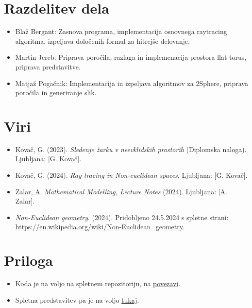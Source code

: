 \documentclass[titlepage]{article}
\begin{document}
\section{Razdelitev dela}
\begin{itemize}
  \item Blaž Bergant: Zasnova programa, implementacija osnovnega raytracing algoritma, izpeljava določenih formul za hitrejše delovanje.
  \item Martin Jereb: Priprava poročila, razlaga in implemenacija prostora flat torus, priprava predstavitve.
\item Matjaž Pogačnik: Implementacija in izpeljava algoritmov za 2Sphere, priprava poročila in generiranje slik.
\end{itemize}

\section{Viri}
\begin{itemize}
  \item Kovač, G. (2023). \textit{Sledenje žarku v neevklidskih prostorih} (Diplomska naloga). Ljubljana: [G. Kovač].
  \item Kovač, G. (2024). \textit{Ray tracing in Non-euclidean spaces}. Ljubljana: [G. Kovač].
  \item Zalar, A. \textit{Mathematical Modelling, Lecture Notes} (2024). Ljubljana: [A. Zalar].
  \item \textit{Non-Euclidean geometry}. (2024). Pridobljeno 24.5.2024 s spletne strani: \url{https://en.wikipedia.org/wiki/Non-Euclidean_geometry.}
\end{itemize}

\section{Priloga}
\begin{itemize}
  \item Koda je na voljo na spletnem repozitoriju, na \href{https://github.com/MAZI2/Ray-tracing-non-euclidean-spaces}{povezavi}.
  \item Spletna predstavitev pa je na voljo \href{https://docs.google.com/presentation/d/1NP8gkPzV8rE2ToBoUAP4b7w2yMkAWgCmlsRPMn_5Ahc/edit?usp=sharing}{tukaj}.
\end{itemize}
\end{document}
